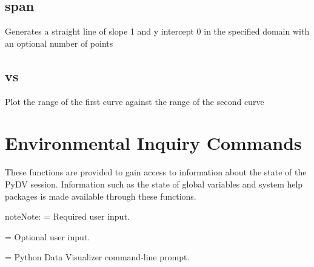\documentclass[letterpaper,10pt,english]{sphinxmanual}
\begin{document}
\subsection{span}
\label{\detokenize{math_operations:span}}
Generates a straight line of slope 1 and y intercept 0 in the specified domain with an optional number of points

\begin{sphinxVerbatim}[commandchars=\\\{\}]
\PYG{p}{[}\PYG{p}{]}    \PYG{p}{[}\PYG{p}{]}
\end{sphinxVerbatim}


\subsection{vs}
\label{\detokenize{math_operations:vs}}
Plot the range of the first curve against the range of the second curve

\begin{sphinxVerbatim}[commandchars=\\\{\}]
\PYG{p}{[}\PYG{p}{]}   
\end{sphinxVerbatim}


\section{Environmental Inquiry Commands}
\label{\detokenize{env_inquiry_cmds:environmental-inquiry-commands}}\label{\detokenize{env_inquiry_cmds:env-inquiry-commands}}\label{\detokenize{env_inquiry_cmds::doc}}
These functions are provided to gain access to information about the state of the PyDV session. Information such as the state of global variables and system help packages is made available through these functions.

\begin{sphinxadmonition}{note}{Note:}
\sphinxstylestrong{\textless{} \textgreater{}} = Required user input.

\sphinxstylestrong{{[} {]}} = Optional user input.

\sphinxstylestrong{{[}PyDV{]}:} = Python Data Visualizer command-line prompt.
\end{sphinxadmonition}
\end{document}
